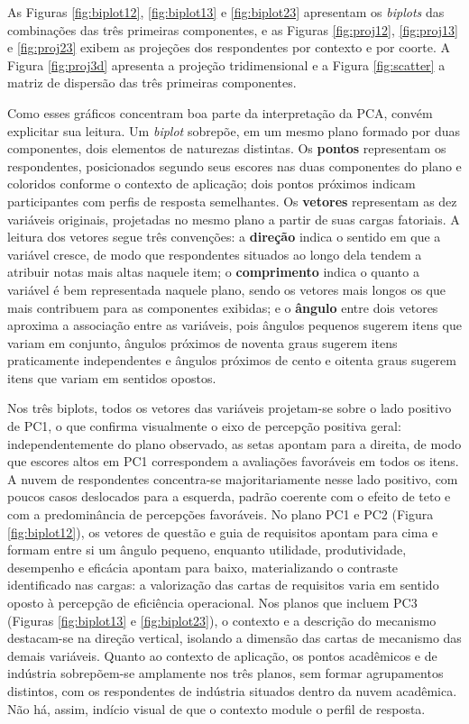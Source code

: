 As Figuras \ref{fig:biplot12}, \ref{fig:biplot13} e \ref{fig:biplot23} apresentam os \textit{biplots} das combinações das três primeiras componentes, e as Figuras \ref{fig:proj12}, \ref{fig:proj13} e \ref{fig:proj23} exibem as projeções dos respondentes por contexto e por coorte. A Figura \ref{fig:proj3d} apresenta a projeção tridimensional e a Figura \ref{fig:scatter} a matriz de dispersão das três primeiras componentes.

Como esses gráficos concentram boa parte da interpretação da PCA, convém explicitar sua leitura. Um \textit{biplot} sobrepõe, em um mesmo plano formado por duas componentes, dois elementos de naturezas distintas. Os \textbf{pontos} representam os respondentes, posicionados segundo seus escores nas duas componentes do plano e coloridos conforme o contexto de aplicação; dois pontos próximos indicam participantes com perfis de resposta semelhantes. Os \textbf{vetores} representam as dez variáveis originais, projetadas no mesmo plano a partir de suas cargas fatoriais. A leitura dos vetores segue três convenções: a \textbf{direção} indica o sentido em que a variável cresce, de modo que respondentes situados ao longo dela tendem a atribuir notas mais altas naquele item; o \textbf{comprimento} indica o quanto a variável é bem representada naquele plano, sendo os vetores mais longos os que mais contribuem para as componentes exibidas; e o \textbf{ângulo} entre dois vetores aproxima a associação entre as variáveis, pois ângulos pequenos sugerem itens que variam em conjunto, ângulos próximos de noventa graus sugerem itens praticamente independentes e ângulos próximos de cento e oitenta graus sugerem itens que variam em sentidos opostos.

Nos três biplots, todos os vetores das variáveis projetam-se sobre o lado positivo de PC1, o que confirma visualmente o eixo de percepção positiva geral: independentemente do plano observado, as setas apontam para a direita, de modo que escores altos em PC1 correspondem a avaliações favoráveis em todos os itens. A nuvem de respondentes concentra-se majoritariamente nesse lado positivo, com poucos casos deslocados para a esquerda, padrão coerente com o efeito de teto e com a predominância de percepções favoráveis. No plano PC1 e PC2 (Figura \ref{fig:biplot12}), os vetores de questão e guia de requisitos apontam para cima e formam entre si um ângulo pequeno, enquanto utilidade, produtividade, desempenho e eficácia apontam para baixo, materializando o contraste identificado nas cargas: a valorização das cartas de requisitos varia em sentido oposto à percepção de eficiência operacional. Nos planos que incluem PC3 (Figuras \ref{fig:biplot13} e \ref{fig:biplot23}), o contexto e a descrição do mecanismo destacam-se na direção vertical, isolando a dimensão das cartas de mecanismo das demais variáveis. Quanto ao contexto de aplicação, os pontos acadêmicos e de indústria sobrepõem-se amplamente nos três planos, sem formar agrupamentos distintos, com os respondentes de indústria situados dentro da nuvem acadêmica. Não há, assim, indício visual de que o contexto module o perfil de resposta.

